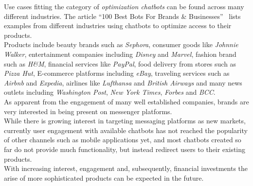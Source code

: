 Use cases fitting the category of \emph{optimization chatbots} can be found across many different industries.
The article ``100 Best Bots For Brands \& Businesses''~\cite{topbots} lists examples from different industries using chatbots to optimize access to their products.
\\
Products include beauty brands such as \emph{Sephora}, consumer goods like \emph{Johnnie Walker}, entertainment companies including \emph{Disney} and \emph{Marvel}, fashion brand such as \emph{H\&M}, financial services like \emph{PayPal}, food delivery from stores such as \emph{Pizza Hut}, E-commerce platforms including \emph{eBay}, traveling services such as \emph{Airbnb} and \emph{Expedia}, airlines like \emph{Lufthansa} and \emph{British Airways} and many news outlets including \emph{Washington Post}, \emph{New York Times}, \emph{Forbes} and \emph{BCC}.
\\


As apparent from the engagement of many well established companies, brands are very interested in being present on messenger platforms.
\\

While there is growing interest in targeting messaging platforms as new markets, currently user engagement with available chatbots has not reached the popularity of other channels such as mobile applications yet,
and most chatbots created so far do not provide much functionality, but instead redirect users to their existing products.
\\

With increasing interest, engagement and, subsequently, financial investments the arise of more sophisticated products can be expected in the future.
